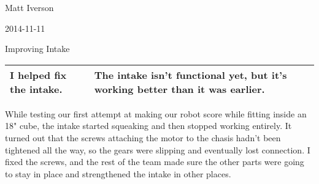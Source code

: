 Matt Iverson

2014-11-11

Improving Intake

\begin{tabular}{|p{5cm}|p{5cm}|}
 \hline
 I helped fix the intake.
 &
 The intake isn't functional yet, but it's working better than it was earlier.
 \\
 \hline
\end{tabular}


While testing our first attempt at making our robot score while fitting inside an 18" cube, the intake started squeaking and then stopped working entirely. It turned out that the screws attaching the motor to the chasis hadn't been tightened all the way, so the gears were slipping and eventually lost connection. I fixed the screws, and the rest of the team made sure the other parts were going to stay in place and strengthened the intake in other places.
